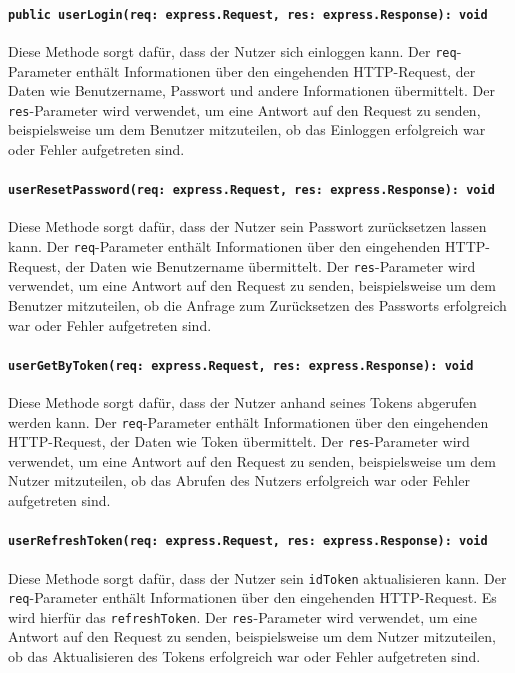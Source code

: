 \documentclass{entwurfsheft}
\begin{document}
\paragraph{\texttt{public userLogin(req: express.Request, res: express.Response): void}}
Diese Methode sorgt dafür, dass der Nutzer sich einloggen kann. Der \texttt{req}-Parameter enthält Informationen über den eingehenden HTTP-Request, der Daten wie Benutzername, Passwort und andere Informationen übermittelt. Der \texttt{res}-Parameter wird verwendet, um eine Antwort auf den Request zu senden, beispielsweise um dem Benutzer mitzuteilen, ob das Einloggen erfolgreich war oder Fehler aufgetreten sind. 
\paragraph{\texttt{userResetPassword(req: express.Request, res: express.Response): void}}
Diese Methode sorgt dafür, dass der Nutzer sein Passwort zurücksetzen lassen kann. Der \texttt{req}-Parameter enthält Informationen über den eingehenden HTTP-Request, der Daten wie Benutzername übermittelt. Der \texttt{res}-Parameter wird verwendet, um eine Antwort auf den Request zu senden, beispielsweise um dem Benutzer mitzuteilen, ob die Anfrage zum Zurücksetzen des Passworts erfolgreich war oder Fehler aufgetreten sind. 
\paragraph{\texttt{userGetByToken(req: express.Request, res: express.Response): void}}
Diese Methode sorgt dafür, dass der Nutzer anhand seines Tokens abgerufen werden kann. Der \texttt{req}-Parameter enthält Informationen über den eingehenden HTTP-Request, der Daten wie Token übermittelt. Der \texttt{res}-Parameter wird verwendet, um eine Antwort auf den Request zu senden, beispielsweise um dem Nutzer mitzuteilen, ob das Abrufen des Nutzers erfolgreich war oder Fehler aufgetreten sind.
\paragraph{\texttt{userRefreshToken(req: express.Request, res: express.Response): void}}
Diese Methode sorgt dafür, dass der Nutzer sein \texttt{idToken} aktualisieren kann. Der \texttt{req}-Parameter enthält Informationen über den eingehenden HTTP-Request. Es wird hierfür das \texttt{refreshToken}. Der \texttt{res}-Parameter wird verwendet, um eine Antwort auf den Request zu senden, beispielsweise um dem Nutzer mitzuteilen, ob das Aktualisieren des Tokens erfolgreich war oder Fehler aufgetreten sind.
\end{document}
